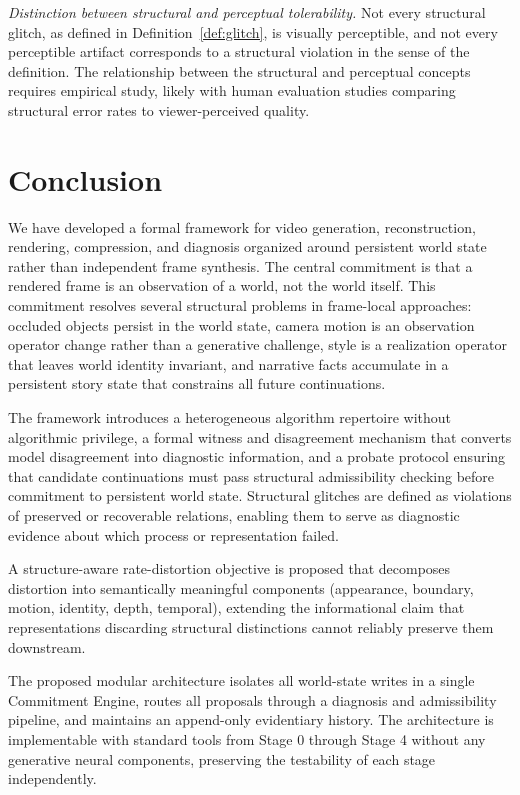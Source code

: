 \documentclass[12pt,a4paper]{article}
\theoremstyle{plain}
\theoremstyle{definition}
\theoremstyle{remark}
\begin{document}
\textit{Distinction between structural and perceptual tolerability.} Not every structural glitch, as defined in Definition~\ref{def:glitch}, is visually perceptible, and not every perceptible artifact corresponds to a structural violation in the sense of the definition. The relationship between the structural and perceptual concepts requires empirical study, likely with human evaluation studies comparing structural error rates to viewer-perceived quality.

\section{Conclusion}
\label{sec:conclusion}

We have developed a formal framework for video generation, reconstruction, rendering, compression, and diagnosis organized around persistent world state rather than independent frame synthesis. The central commitment is that a rendered frame is an observation of a world, not the world itself. This commitment resolves several structural problems in frame-local approaches: occluded objects persist in the world state, camera motion is an observation operator change rather than a generative challenge, style is a realization operator that leaves world identity invariant, and narrative facts accumulate in a persistent story state that constrains all future continuations.

The framework introduces a heterogeneous algorithm repertoire without algorithmic privilege, a formal witness and disagreement mechanism that converts model disagreement into diagnostic information, and a probate protocol ensuring that candidate continuations must pass structural admissibility checking before commitment to persistent world state. Structural glitches are defined as violations of preserved or recoverable relations, enabling them to serve as diagnostic evidence about which process or representation failed.

A structure-aware rate-distortion objective is proposed that decomposes distortion into semantically meaningful components (appearance, boundary, motion, identity, depth, temporal), extending the informational claim that representations discarding structural distinctions cannot reliably preserve them downstream.

The proposed modular architecture isolates all world-state writes in a single Commitment Engine, routes all proposals through a diagnosis and admissibility pipeline, and maintains an append-only evidentiary history. The architecture is implementable with standard tools from Stage 0 through Stage 4 without any generative neural components, preserving the testability of each stage independently.
\end{document}
